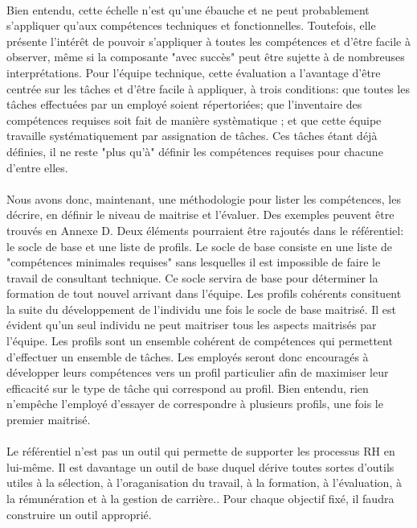 \paragraph{}Bien entendu, cette échelle n'est qu'une ébauche et ne peut probablement s'appliquer qu'aux compétences techniques et fonctionnelles. Toutefois, elle présente l'intérêt de pouvoir s'appliquer à toutes les compétences et d'être facile à observer, même si la composante "avec succès" peut être sujette à de nombreuses interprétations. Pour l'équipe technique, cette évaluation a l'avantage d'être centrée sur les tâches et d'être facile à appliquer, à trois conditions: que toutes les tâches effectuées par un employé soient répertoriées; que l'inventaire des compétences requises soit fait de manière systèmatique ; et que cette équipe travaille systématiquement par assignation de tâches. Ces tâches étant déjà définies, il ne reste "plus qu'à" définir les compétences requises pour chacune d'entre elles. 

\paragraph{} Nous avons donc, maintenant, une méthodologie pour lister les compétences, les décrire, en définir le niveau de maitrise et l'évaluer. Des exemples peuvent être trouvés en Annexe D. Deux éléments pourraient être rajoutés dans le référentiel: le socle de base et une liste de profils. Le socle de base consiste en une liste de "compétences minimales requises" sans lesquelles il est impossible de faire le travail de consultant technique. Ce socle servira de base pour déterminer la formation de tout nouvel arrivant dans l'équipe. Les profils cohérents consituent la suite du développement de l'individu une fois le socle de base maitrisé. Il est évident qu'un seul individu ne peut maitriser tous les aspects maitrisés par l'équipe. Les profils sont un ensemble cohérent de compétences qui permettent d'effectuer un ensemble de tâches. Les employés seront donc encouragés à développer leurs compétences vers un profil particulier afin de maximiser leur efficacité sur le type de tâche qui correspond au profil. Bien entendu, rien n'empêche l'employé d'essayer de correspondre à plusieurs profils, une fois le premier maitrisé.  


\paragraph{}Le référentiel n'est pas un outil qui permette de supporter les processus RH en lui-même. Il est davantage un outil de base duquel dérive toutes sortes d'outils utiles à la sélection, à l'oraganisation du travail, à la formation, à l'évaluation, à la rémunération et à la gestion de carrière.\citep[pp.29]{refcompetence}. Pour chaque objectif fixé, il faudra construire un outil approprié. 

